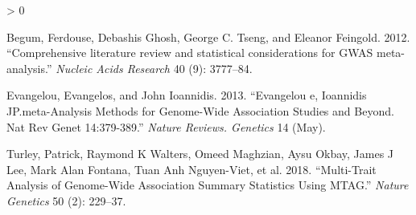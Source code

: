 \documentclass[
]{article}
\newlength{\cslhangindent}
\newenvironment{CSLReferences}[2] %
 {%
  \setlength{\parindent}{0pt}
  \ifodd #1 \everypar{\setlength{\hangindent}{\cslhangindent}}\ignorespaces\fi
  \ifnum #2 > 0
  \setlength{\parskip}{#2\baselineskip}
  \fi
 }%
 {}
\begin{document}
\setlength{\parindent}{-0.2in}
\setlength{\leftskip}{0.2in}
\setlength{\parskip}{8pt}

\noindent

\hypertarget{refs}{}
\begin{CSLReferences}{1}{0}
\leavevmode\hypertarget{ref-meta1}{}%
Begum, Ferdouse, Debashis Ghosh, George C. Tseng, and Eleanor Feingold.
2012. {``{Comprehensive literature review and statistical considerations
for GWAS meta-analysis}.''} \emph{Nucleic Acids Research} 40 (9):
3777--84.

\leavevmode\hypertarget{ref-meta2}{}%
Evangelou, Evangelos, and John Ioannidis. 2013. {``Evangelou e,
Ioannidis JP.meta-Analysis Methods for Genome-Wide Association Studies
and Beyond. Nat Rev Genet 14:379-389.''} \emph{Nature Reviews. Genetics}
14 (May).

\leavevmode\hypertarget{ref-MTAG}{}%
Turley, Patrick, Raymond K Walters, Omeed Maghzian, Aysu Okbay, James J
Lee, Mark Alan Fontana, Tuan Anh Nguyen-Viet, et al. 2018.
{``Multi-Trait Analysis of Genome-Wide Association Summary Statistics
Using MTAG.''} \emph{Nature Genetics} 50 (2): 229--37.

\end{CSLReferences}
\end{document}
